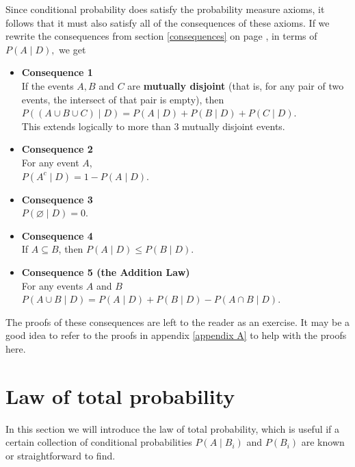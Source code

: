 \noindent Since conditional probability does satisfy the probability measure axioms, it follows that it must also satisfy all of the consequences of these axioms. If we rewrite the consequences from section \ref{consequences} on page \pageref{consequences}, in terms of $P(A \! \mid \! D),$ we get
\begin{itemize}
\item \textbf{Consequence 1} \label{consequence1} \\
If the events $A, B$ and $C$ are \textbf{mutually disjoint} \label{mutually disjoint} (that is, for any pair of two events, the intersect of that pair is empty), then \\
$P((A \cup B \cup C) \! \mid \! D ) = P(A \! \mid \! D) + P(B \! \mid \! D) + P(C \! \mid \! D)$. \\

This extends logically to more than 3 mutually disjoint events.
\item \textbf{Consequence 2} \\
For any event $A$, \\
$P(A^c \! \mid \! D) = 1 - P(A \! \mid \! D).$

\item \textbf{Consequence 3} \\
$P(\varnothing \! \mid \! D) = 0.$

\item \textbf{Consequence 4} \\
If $A \subseteq B$, then $P(A \! \mid \! D) \leq P(B \! \mid \! D)$.

\item \textbf{Consequence 5 (the Addition Law)} \label{addition law} \\ 
For any events $A$ and $B$ \\
$P(A \cup B \! \mid \! D) = P(A \! \mid \! D) + P(B \! \mid \! D) - P(A \cap B \! \mid \! D)$.
\end{itemize}
The proofs of these consequences are left to the reader as an exercise. It may be a good idea to refer to the proofs in appendix \ref{appendix A} to help with the proofs here.

\section{Law of total probability} \label{exhaustive} \label{law of total probability}
In this section we will introduce the law of total probability, which is useful if a certain collection of conditional probabilities $P(A\!\mid \! B_i)$ and $P(B_i)$ are known or straightforward to find. \\

